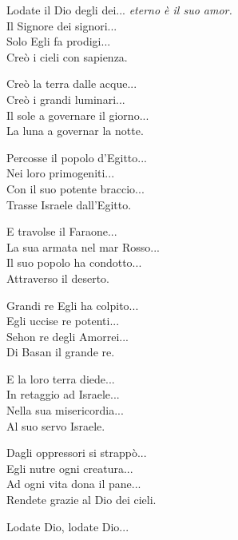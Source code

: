 
 

\spazio

\strofa  Lodate il Dio degli dei... \emph{eterno è il suo amor.}\\
Il Signore dei signori...\\
Solo Egli fa prodigi...\\
Creò i cieli con sapienza.

\spazio

Creò la terra dalle acque...\\
Creò i grandi luminari...\\
Il sole a governare il giorno...\\
La luna a governar la notte.

\spazio

Percosse il popolo d'Egitto...\\
Nei loro primogeniti...\\
Con il suo potente braccio...\\
Trasse Israele dall'Egitto.

\spazio

 

\spazio

\strofa  E travolse il Faraone...\\ 
La sua armata nel mar Rosso...\\
Il suo popolo ha condotto...\\
Attraverso il deserto.

\spazio

Grandi re Egli ha colpito...\\ 
Egli uccise re potenti...\\
Sehon re degli Amorrei...\\ 
Di Basan il grande re.

\spazio

E la loro terra diede...\\ 
In retaggio ad Israele...\\
Nella sua misericordia...\\
Al suo servo Israele.

\spazio

 

\spazio

\strofa Dagli oppressori si strappò...\\
Egli nutre ogni creatura...\\
Ad ogni vita dona il pane...\\ 
Rendete grazie al Dio dei cieli.

\spazio

Lodate Dio, lodate Dio... 